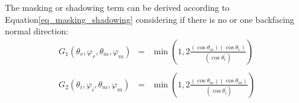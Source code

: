 The masking or shadowing term can be derived according to Equation\eqref{eq_masking_shadowing} considering if there is no or one backfacing normal direction:
\[
    \begin{array}{lll}
        G_1(\theta_r, \varphi_r, \theta_m, \varphi_m) & = & \displaystyle{\min\left(1, %
        2\frac{(\cos\theta_m)(\cos\theta_r)}{(\cos\theta_r^\prime)}\right)}            \\ \\
        G_2(\theta_i, \varphi_i, \theta_m, \varphi_m) & = & \displaystyle{\min\left(1, %
            2\frac{(\cos\theta_m)(\cos\theta_m)}{(\cos\theta_i^\prime)}\right)}
    \end{array}
\]

